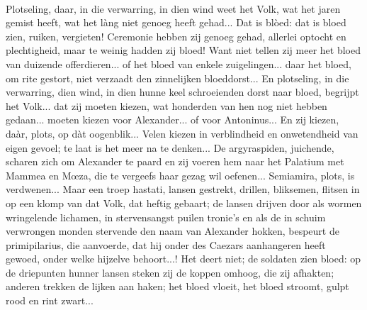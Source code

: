 \documentclass[a4paper, 12pt, oneside, dutch]{article}
\begin{document}
\paragraph{}
Plotseling, daar, in die verwarring, in dien wind weet het Volk, wat het jaren gemist heeft, wat het làng niet genoeg heeft gehad... Dat is blòed: dat is bloed zien, ruiken, vergieten! Ceremonie hebben zij genoeg gehad, allerlei optocht en plechtigheid, maar te weinig hadden zij bloed! Want niet tellen zij meer het bloed van duizende offerdieren... of het bloed van enkele zuigelingen... daar het bloed, om rite gestort, niet verzaadt den zinnelijken bloeddorst... En plotseling, in die verwarring, dien wind, in dien hunne keel schroeienden dorst naar bloed, begrijpt het Volk... dat zij moeten kiezen, wat honderden van hen nog niet hebben gedaan... moeten kiezen voor Alexander... of voor Antoninus... En zij kiezen, daàr, plots, op dàt oogenblik... Velen kiezen in verblindheid en onwetendheid van eigen gevoel; te laat is het meer na te denken... De argyraspiden, juichende, scharen zich om Alexander te paard en zij voeren hem naar het Palatium met Mammea en Mœza, die te vergeefs haar gezag wil oefenen... Semiamira, plots, is verdwenen... Maar een troep hastati, lansen gestrekt, drillen, bliksemen, flitsen in op een klomp van dat Volk, dat heftig gebaart; de lansen drijven door als wormen wringelende lichamen, in stervensangst puilen tronie's en als de in schuim verwrongen monden stervende den naam van Alexander hokken, bespeurt de primipilarius, die aanvoerde, dat hij onder des Caezars aanhangeren heeft gewoed, onder welke hijzelve behoort...! Het deert niet; de soldaten zien bloed: op de driepunten hunner lansen steken zij de koppen omhoog, die zij afhakten; anderen trekken de lijken aan haken; het bloed vloeit, het bloed stroomt, gulpt rood en rint zwart...
\end{document}
